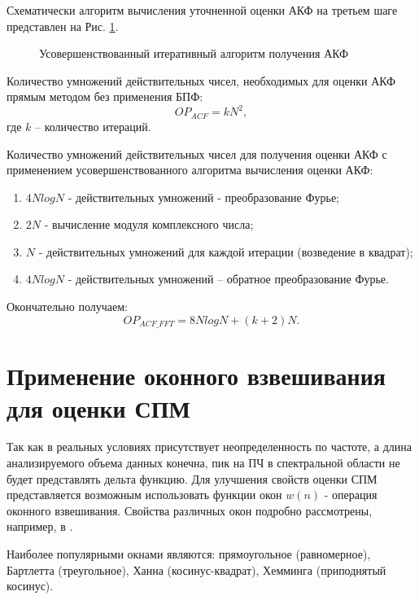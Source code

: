Схематически алгоритм вычисления уточненной оценки АКФ на третьем шаге представлен на Рис. \ref{pic:akf_pic}.

\begin{figure}[h]
	\center{}
	\caption{Усовершенствованный итеративный алгоритм получения АКФ}
	\label{pic:akf_pic}
\end{figure}

Количество умножений действительных чисел, необходимых для оценки АКФ прямым методом без применения БПФ: 
\begin{equation}
	\label{eq:num_of_op_acf}
	OP_{ACF}=kN^2,
\end{equation}
где ${k}$  – количество итераций.

Количество умножений действительных чисел для получения оценки АКФ с применением усовершенствованного алгоритма вычисления оценки АКФ:
\begin{enumerate}
\item ${4NlogN}$ - действительных умножений - преобразование Фурье;
\item ${2N}$ - вычисление модуля комплексного числа;
\item ${N}$ - действительных умножений для каждой итерации (возведение в квадрат);
\item ${4NlogN}$ - действительных умножений – обратное преобразование Фурье. 
\end{enumerate}

Окончательно получаем:
\begin{equation}
	\label{eq:num_of_op_acf}
	OP_{ACF\_FFT}=8NlogN + (k+2)N.
\end{equation}

\section{Применение оконного взвешивания для оценки СПМ}

Так как в реальных условиях присутствует неопределенность по частоте, а длина анализируемого объема данных конечна, пик на ПЧ в спектральной области не будет
представлять дельта функцию. Для улучшения свойств оценки СПМ представляется возможным использовать функции окон ${w(n)}$ - операция оконного взвешивания.
Свойства различных окон подробно рассмотрены, например, в \cite{shahtarin-spectrum-book, bolshakov-book}.

Наиболее популярными окнами являются: прямоугольное (равномерное), Бартлетта (треугольное), Ханна (косинус-квадрат), Хемминга (приподнятый косинус).

